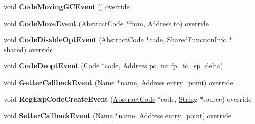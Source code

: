 \begin{DoxyCompactItemize}
\item 
void {\bfseries Code\+Moving\+G\+C\+Event} () override\hypertarget{classv8_1_1internal_1_1_cpu_profiler_a6dff50261437dd8c8fbe1a8e5ebee5e4}{}\label{classv8_1_1internal_1_1_cpu_profiler_a6dff50261437dd8c8fbe1a8e5ebee5e4}

\item 
void {\bfseries Code\+Move\+Event} (\hyperlink{classv8_1_1internal_1_1_abstract_code}{Abstract\+Code} $\ast$from, Address to) override\hypertarget{classv8_1_1internal_1_1_cpu_profiler_aa40d767fbc86843d277645727deeba2d}{}\label{classv8_1_1internal_1_1_cpu_profiler_aa40d767fbc86843d277645727deeba2d}

\item 
void {\bfseries Code\+Disable\+Opt\+Event} (\hyperlink{classv8_1_1internal_1_1_abstract_code}{Abstract\+Code} $\ast$code, \hyperlink{classv8_1_1internal_1_1_shared_function_info}{Shared\+Function\+Info} $\ast$shared) override\hypertarget{classv8_1_1internal_1_1_cpu_profiler_ad5ebfb992da5f28d1ce26c03df9bc678}{}\label{classv8_1_1internal_1_1_cpu_profiler_ad5ebfb992da5f28d1ce26c03df9bc678}

\item 
void {\bfseries Code\+Deopt\+Event} (\hyperlink{classv8_1_1internal_1_1_code}{Code} $\ast$code, Address pc, int fp\+\_\+to\+\_\+sp\+\_\+delta)\hypertarget{classv8_1_1internal_1_1_cpu_profiler_a1b75252a785fedc7d01ffe73f0f081a1}{}\label{classv8_1_1internal_1_1_cpu_profiler_a1b75252a785fedc7d01ffe73f0f081a1}

\item 
void {\bfseries Getter\+Callback\+Event} (\hyperlink{classv8_1_1internal_1_1_name}{Name} $\ast$name, Address entry\+\_\+point) override\hypertarget{classv8_1_1internal_1_1_cpu_profiler_a83c557855843c033ea4b574547169e3a}{}\label{classv8_1_1internal_1_1_cpu_profiler_a83c557855843c033ea4b574547169e3a}

\item 
void {\bfseries Reg\+Exp\+Code\+Create\+Event} (\hyperlink{classv8_1_1internal_1_1_abstract_code}{Abstract\+Code} $\ast$code, \hyperlink{classv8_1_1internal_1_1_string}{String} $\ast$source) override\hypertarget{classv8_1_1internal_1_1_cpu_profiler_a961fa95b290e42e6760ee0b82b395e77}{}\label{classv8_1_1internal_1_1_cpu_profiler_a961fa95b290e42e6760ee0b82b395e77}

\item 
void {\bfseries Setter\+Callback\+Event} (\hyperlink{classv8_1_1internal_1_1_name}{Name} $\ast$name, Address entry\+\_\+point) override\hypertarget{classv8_1_1internal_1_1_cpu_profiler_aacf2b6fe006d254b73309445e7538b66}{}\label{classv8_1_1internal_1_1_cpu_profiler_aacf2b6fe006d254b73309445e7538b66}


\end{DoxyCompactItemize}
